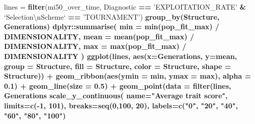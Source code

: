 \documentclass[]{book}
\newenvironment{Shaded}{\begin{snugshade}}{\end{snugshade}}
\newcommand{\CharTok}[1]{\textcolor[rgb]{0.31,0.60,0.02}{#1}}
\newcommand{\DataTypeTok}[1]{\textcolor[rgb]{0.13,0.29,0.53}{#1}}
\newcommand{\DecValTok}[1]{\textcolor[rgb]{0.00,0.00,0.81}{#1}}
\newcommand{\FloatTok}[1]{\textcolor[rgb]{0.00,0.00,0.81}{#1}}
\newcommand{\KeywordTok}[1]{\textcolor[rgb]{0.13,0.29,0.53}{\textbf{#1}}}
\newcommand{\NormalTok}[1]{#1}
\newcommand{\OperatorTok}[1]{\textcolor[rgb]{0.81,0.36,0.00}{\textbf{#1}}}
\newcommand{\StringTok}[1]{\textcolor[rgb]{0.31,0.60,0.02}{#1}}
\begin{document}
\begin{Shaded}
\begin{Highlighting}[]
\NormalTok{lines =}\StringTok{ }\KeywordTok{filter}\NormalTok{(mi50_over_time, Diagnostic }\OperatorTok{==}\StringTok{ 'EXPLOITATION_RATE'} \OperatorTok{&}\StringTok{ `}\DataTypeTok{Selection}\CharTok{\textbackslash{}n}\DataTypeTok{Scheme}\StringTok{`} \OperatorTok{==}\StringTok{ 'TOURNAMENT'}\NormalTok{) }\OperatorTok{%>%}
\StringTok{  }\KeywordTok{group_by}\NormalTok{(Structure, Generations) }\OperatorTok{%>%}
\StringTok{  }\NormalTok{dplyr}\OperatorTok{::}\KeywordTok{summarise}\NormalTok{(}
    \DataTypeTok{min =} \KeywordTok{min}\NormalTok{(pop_fit_max) }\OperatorTok{/}\StringTok{ }\NormalTok{DIMENSIONALITY,}
    \DataTypeTok{mean =} \KeywordTok{mean}\NormalTok{(pop_fit_max) }\OperatorTok{/}\StringTok{ }\NormalTok{DIMENSIONALITY,}
    \DataTypeTok{max =} \KeywordTok{max}\NormalTok{(pop_fit_max) }\OperatorTok{/}\StringTok{ }\NormalTok{DIMENSIONALITY}
\NormalTok{  )}
\KeywordTok{ggplot}\NormalTok{(lines, }\KeywordTok{aes}\NormalTok{(}\DataTypeTok{x=}\NormalTok{Generations, }\DataTypeTok{y=}\NormalTok{mean, }\DataTypeTok{group =}\NormalTok{ Structure, }\DataTypeTok{fill =}\NormalTok{ Structure, }\DataTypeTok{color =}\NormalTok{ Structure, }\DataTypeTok{shape =}\NormalTok{ Structure)) }\OperatorTok{+}
\StringTok{  }\KeywordTok{geom_ribbon}\NormalTok{(}\KeywordTok{aes}\NormalTok{(}\DataTypeTok{ymin =}\NormalTok{ min, }\DataTypeTok{ymax =}\NormalTok{ max), }\DataTypeTok{alpha =} \FloatTok{0.1}\NormalTok{) }\OperatorTok{+}
\StringTok{  }\KeywordTok{geom_line}\NormalTok{(}\DataTypeTok{size =} \FloatTok{0.5}\NormalTok{) }\OperatorTok{+}
\StringTok{  }\KeywordTok{geom_point}\NormalTok{(}\DataTypeTok{data =} \KeywordTok{filter}\NormalTok{(lines, Generations }\OperatorTok{%%}\StringTok{ }\DecValTok{2000} \OperatorTok{==}\StringTok{ }\DecValTok{0}\NormalTok{), }\DataTypeTok{size =} \FloatTok{2.5}\NormalTok{, }\DataTypeTok{stroke =} \FloatTok{2.0}\NormalTok{, }\DataTypeTok{alpha =} \FloatTok{1.0}\NormalTok{) }\OperatorTok{+}
\StringTok{  }\KeywordTok{scale_y_continuous}\NormalTok{(}
    \DataTypeTok{name=}\StringTok{"Average trait score"}\NormalTok{,}
    \DataTypeTok{limits=}\KeywordTok{c}\NormalTok{(}\OperatorTok{-}\DecValTok{1}\NormalTok{, }\DecValTok{101}\NormalTok{),}
    \DataTypeTok{breaks=}\KeywordTok{seq}\NormalTok{(}\DecValTok{0}\NormalTok{,}\DecValTok{100}\NormalTok{, }\DecValTok{20}\NormalTok{),}
    \DataTypeTok{labels=}\KeywordTok{c}\NormalTok{(}\StringTok{"0"}\NormalTok{, }\StringTok{"20"}\NormalTok{, }\StringTok{"40"}\NormalTok{, }\StringTok{"60"}\NormalTok{, }\StringTok{"80"}\NormalTok{, }\StringTok{"100"}\NormalTok{)}
}}}
\end{Highlighting}
\end{Shaded}
\end{document}
